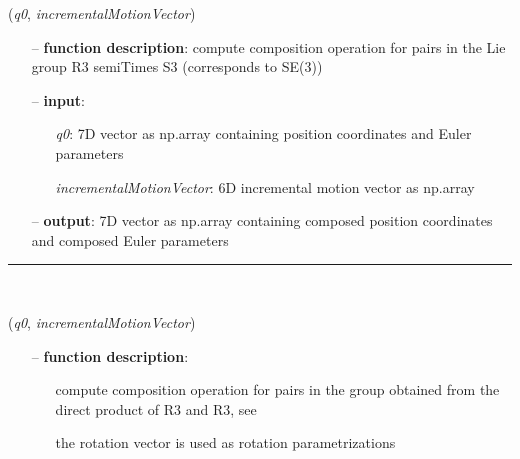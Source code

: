 \begin{itemize}[leftmargin=1.4cm]
\begin{itemize}[leftmargin=0.5cm]
\begin{itemize}[leftmargin=1.4cm]
\begin{itemize}[leftmargin=0.5cm]
\begin{itemize}[leftmargin=1.4cm]
\begin{itemize}[leftmargin=0.5cm]
\begin{itemize}[leftmargin=1.4cm]
\begin{itemize}[leftmargin=1.4cm]
\begin{itemize}[leftmargin=1.4cm]
\begin{itemize}[leftmargin=1.4cm]
\begin{itemize}[leftmargin=0.5cm]
\begin{flushleft}
\label{sec:lieGroupBasics:CompositionRuleSemiDirectProductR3AndS3}
({\it q0}, {\it incrementalMotionVector})
\end{flushleft}
\setlength{\itemindent}{0.7cm}
\begin{itemize}[leftmargin=0.7cm]
  \item[--]  {\bf function description}: compute composition operation for pairs in the Lie group R3 semiTimes S3 (corresponds to SE(3))  \item[--]  {\bf input}: \vspace{-6pt}
  \begin{itemize}[leftmargin=1.2cm]
\setlength{\itemindent}{-0.7cm}
    \item[] {\it q0}: 7D vector as np.array containing position coordinates and Euler parameters
    \item[] {\it   incrementalMotionVector}: 6D incremental motion vector as np.array
  \end{itemize}
  \item[--]  {\bf output}: 7D vector as np.array containing composed position coordinates and composed Euler parameters\vspace{12pt}\end{itemize}
%
\noindent\rule{8cm}{0.75pt}\vspace{1pt} \\ 
\begin{flushleft}
\label{sec:lieGroupBasics:CompositionRuleDirectProductR3AndR3RotVec}
({\it q0}, {\it incrementalMotionVector})
\end{flushleft}
\setlength{\itemindent}{0.7cm}
\begin{itemize}[leftmargin=0.7cm]
  \item[--]  {\bf function description}: \vspace{-6pt}
  \begin{itemize}[leftmargin=1.2cm]
\setlength{\itemindent}{-0.7cm}
    \item[] compute composition operation for pairs in the group obtained from the direct product of R3 and R3, see \cite{HolzingerGerstmayr2020}
    \item[]             the rotation vector is used as rotation parametrizations

\end{itemize}
\end{itemize}
\end{itemize}
\end{itemize}
\end{itemize}
\end{itemize}
\end{itemize}
\end{itemize}
\end{itemize}
\end{itemize}
\end{itemize}
\end{itemize}
\end{itemize}
